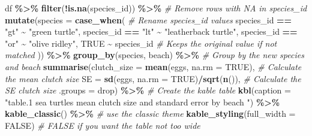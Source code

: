 \documentclass[
]{article}
\newenvironment{Shaded}{\begin{snugshade}}{\end{snugshade}}
\newcommand{\AttributeTok}[1]{\textcolor[rgb]{0.13,0.29,0.53}{#1}}
\newcommand{\CommentTok}[1]{\textcolor[rgb]{0.56,0.35,0.01}{\textit{#1}}}
\newcommand{\ConstantTok}[1]{\textcolor[rgb]{0.56,0.35,0.01}{#1}}
\newcommand{\FunctionTok}[1]{\textcolor[rgb]{0.13,0.29,0.53}{\textbf{#1}}}
\newcommand{\NormalTok}[1]{#1}
\newcommand{\SpecialCharTok}[1]{\textcolor[rgb]{0.81,0.36,0.00}{\textbf{#1}}}
\newcommand{\StringTok}[1]{\textcolor[rgb]{0.31,0.60,0.02}{#1}}
\begin{document}
\begin{Shaded}
\begin{Highlighting}[]
\NormalTok{df }\SpecialCharTok{\%\textgreater{}\%}
  \FunctionTok{filter}\NormalTok{(}\SpecialCharTok{!}\FunctionTok{is.na}\NormalTok{(species\_id)) }\SpecialCharTok{\%\textgreater{}\%}    \CommentTok{\# Remove rows with NA in species\_id}
  \FunctionTok{mutate}\NormalTok{(}\AttributeTok{species =} \FunctionTok{case\_when}\NormalTok{(       }\CommentTok{\# Rename species\_id values}
\NormalTok{    species\_id }\SpecialCharTok{==} \StringTok{"gt"} \SpecialCharTok{\textasciitilde{}} \StringTok{"green turtle"}\NormalTok{,}
\NormalTok{    species\_id }\SpecialCharTok{==} \StringTok{"lt"} \SpecialCharTok{\textasciitilde{}} \StringTok{"leatherback turtle"}\NormalTok{,}
\NormalTok{    species\_id }\SpecialCharTok{==} \StringTok{"or"} \SpecialCharTok{\textasciitilde{}} \StringTok{"olive ridley"}\NormalTok{,}
    \ConstantTok{TRUE} \SpecialCharTok{\textasciitilde{}}\NormalTok{ species\_id               }\CommentTok{\# Keeps the original value if not matched}
\NormalTok{  )) }\SpecialCharTok{\%\textgreater{}\%}
  \FunctionTok{group\_by}\NormalTok{(species, beach) }\SpecialCharTok{\%\textgreater{}\%}                        \CommentTok{\# Group by the new species and beach}
  \FunctionTok{summarise}\NormalTok{(}\AttributeTok{clutch\_size =} \FunctionTok{mean}\NormalTok{(eggs, }\AttributeTok{na.rm =} \ConstantTok{TRUE}\NormalTok{),   }\CommentTok{\# Calculate the mean clutch size}
            \AttributeTok{SE =} \FunctionTok{sd}\NormalTok{(eggs, }\AttributeTok{na.rm =} \ConstantTok{TRUE}\NormalTok{)}\SpecialCharTok{/}\FunctionTok{sqrt}\NormalTok{(}\FunctionTok{n}\NormalTok{()),    }\CommentTok{\# Calculate the SE clutch size}
            \AttributeTok{.groups =} \StringTok{\textquotesingle{}drop\textquotesingle{}}\NormalTok{) }\SpecialCharTok{\%\textgreater{}\%}
  \CommentTok{\# Create the kable table}
  \FunctionTok{kbl}\NormalTok{(}\AttributeTok{caption =} \StringTok{"table.1 sea turtles mean clutch size and standard error by beach "}\NormalTok{) }\SpecialCharTok{\%\textgreater{}\%}
  \FunctionTok{kable\_classic}\NormalTok{() }\SpecialCharTok{\%\textgreater{}\%}                   \CommentTok{\# use the classic theme }
  \FunctionTok{kable\_styling}\NormalTok{(}\AttributeTok{full\_width =} \ConstantTok{FALSE}\NormalTok{)     }\CommentTok{\# FALSE if you want the table not too wide}
\end{Highlighting}
\end{Shaded}
\end{document}
